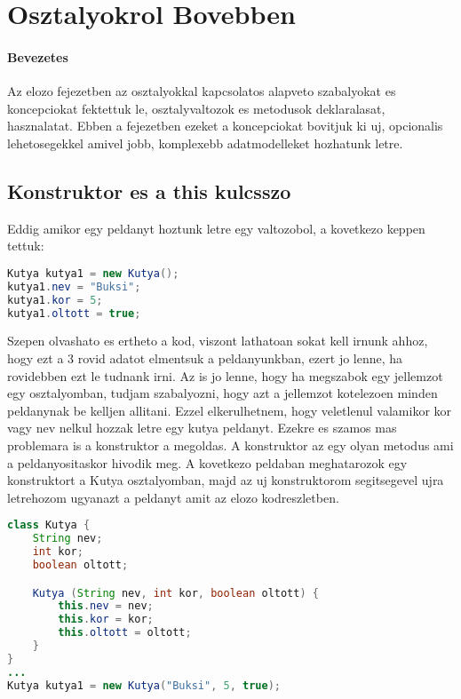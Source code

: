 \documentclass{article}
\begin{document}
\newpage

\section{Osztalyokrol Bovebben}

\paragraph{Bevezetes}

Az elozo fejezetben az osztalyokkal kapcsolatos alapveto szabalyokat es koncepciokat fektettuk le, osztalyvaltozok es
metodusok deklaralasat, hasznalatat. Ebben a fejezetben ezeket a koncepciokat bovitjuk ki uj, opcionalis
lehetosegekkel amivel jobb, komplexebb adatmodelleket hozhatunk letre.

\subsection{Konstruktor es a this kulcsszo}

Eddig amikor egy peldanyt hoztunk letre egy valtozobol, a kovetkezo keppen tettuk:

\begin{lstlisting}[language=Java, caption=Peldanyositas es osztalyvaltozok beallitasa]
Kutya kutya1 = new Kutya();
kutya1.nev = "Buksi";
kutya1.kor = 5;
kutya1.oltott = true;
\end{lstlisting}

Szepen olvashato es ertheto a kod, viszont lathatoan sokat kell irnunk ahhoz, hogy ezt a 3 rovid adatot elmentsuk a
peldanyunkban, ezert jo lenne, ha rovidebben ezt le tudnank irni. Az is jo lenne, hogy ha megszabok egy jellemzot egy
osztalyomban, tudjam szabalyozni, hogy azt a jellemzot kotelezoen minden peldanynak be kelljen allitani. Ezzel
elkerulhetnem, hogy veletlenul valamikor kor vagy nev nelkul hozzak letre egy kutya peldanyt. Ezekre es szamos mas
problemara is a konstruktor a megoldas. A konstruktor az egy olyan metodus ami a peldanyositaskor hivodik meg. A
kovetkezo peldaban meghatarozok egy konstruktort a Kutya osztalyomban, majd az uj konstruktorom segitsegevel ujra
letrehozom ugyanazt a peldanyt amit az elozo kodreszletben.

\begin{lstlisting}[language=Java, caption=Konstruktor pelda]
class Kutya {
    String nev;
    int kor;
    boolean oltott;

    Kutya (String nev, int kor, boolean oltott) {
        this.nev = nev;
        this.kor = kor;
        this.oltott = oltott;
    }
}
...
Kutya kutya1 = new Kutya("Buksi", 5, true);
\end{lstlisting}
\end{document}
